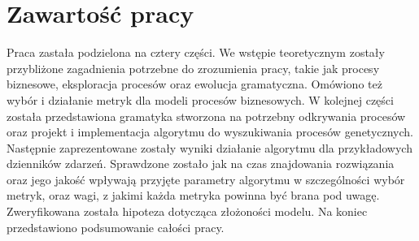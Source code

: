 \section{Zawartość pracy}
\label{sec:zawartoscPracy}

Praca zastała podzielona na cztery części. We wstępie teoretycznym zostały przybliżone zagadnienia potrzebne do zrozumienia pracy, takie jak procesy biznesowe, eksploracja procesów oraz ewolucja gramatyczna. Omówiono też wybór i działanie metryk dla modeli procesów biznesowych. W kolejnej części została przedstawiona gramatyka stworzona na potrzebny odkrywania procesów oraz projekt i implementacja algorytmu do wyszukiwania procesów genetycznych. Następnie zaprezentowane zostały wyniki działanie algorytmu dla przykładowych dzienników zdarzeń. Sprawdzone zostało jak na czas znajdowania rozwiązania oraz jego jakość wpływają przyjęte parametry algorytmu w szczególności wybór metryk, oraz wagi, z jakimi każda metryka powinna być brana pod uwagę. Zweryfikowana została hipoteza dotycząca złożoności modelu. Na koniec przedstawiono podsumowanie całości pracy. 


















